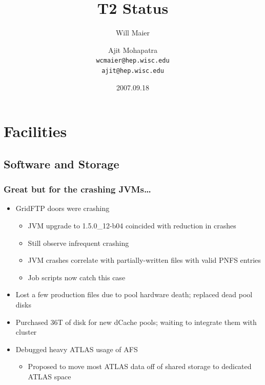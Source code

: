\documentclass{beamer}
\title{T2 Status}
\author[Maier, Mohapatra]{
    Will Maier \and Ajit Mohapatra\\ 
    {\tt wcmaier@hep.wisc.edu}\\
    {\tt ajit@hep.wisc.edu}}
\institute[Wisconsin]{University of Wisconsin - High Energy Physics}
\date{2007.09.18}
\begin{document}
\begin{frame}
    \titlepage
\end{frame}



\section{Facilities}
\subsection{Software and Storage}
\begin{frame}
\frametitle{Great but for the crashing JVMs\ldots{}}
\begin{itemize}
    \item GridFTP doors were crashing
    \begin{itemize}
        \item JVM upgrade to 1.5.0\_12-b04 coincided with reduction in crashes
        \item Still observe infrequent crashing
        \item JVM crashes correlate with partially-written files with valid PNFS entries
        \item Job scripts now catch this case
    \end{itemize}
    \item Lost a few production files due to pool hardware death; replaced dead pool disks
    \item Purchased 36T of disk for new dCache pools; waiting to integrate them with cluster
    \item Debugged heavy ATLAS usage of AFS
    \begin{itemize}
        \item Proposed to move most ATLAS data off of shared storage to dedicated ATLAS space
    \end{itemize}
\end{itemize}
\end{frame}
\end{document}
